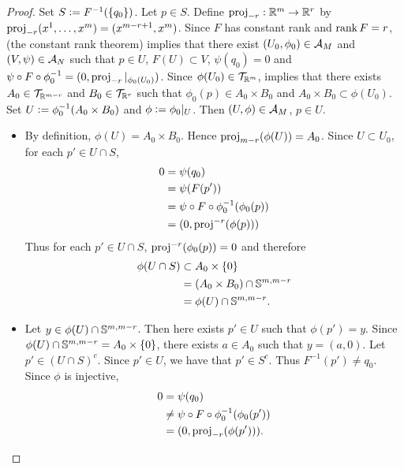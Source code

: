 \documentclass{book}
\begin{document}
	\begin{proof}
		Set $S \defeq F^{-1}(\{q_0\})$. Let $p \in S$. Define $\prj_{-r}: \R^m \rightarrow \R^{r}$ by $\prj_{-r}(x^1, \ldots, x^m) = (x^{m-r+1}, x^{m})$. Since $F$ has constant rank and $\rnk F = r$,  (the constant rank theorem)  implies that there exist $(U_0, \phi_0) \in \MA_M$ and $(V, \psi) \in \MA_N$ such that $p \in U$, $F(U) \subset V$, $\psi(q_0) = 0$ and $\psi \circ F \circ \phi_0^{-1} = (0, \prj_{-r}|_{\phi_0(U_0)})$. Since $\phi(U_0) \in \MT_{\R^m}$,  implies that there exists $A_0 \in \MT_{\R^{m-r}}$ and $B_0 \in \MT_{\R^{r}}$ such that $\phi_0(p) \in A_0 \times B_0$ and $A_0 \times B_0 \subset \phi(U_0)$. Set $U \defeq \phi_0^{-1}(A_0 \times B_0)$ and $\phi \defeq \phi_0|_U$. Then $(U, \phi) \in \MA_M$, $p \in U$. 
		\begin{itemize}
			\item By definition, $\phi(U) = A_0 \times B_0$. Hence $\prj_{m-r}(\phi(U)) = A_0$. Since $U \subset U_0$, for each $p' \in U \cap S$, 
			\begin{align*}
				0
				& = \psi(q_0) \\
				& = \psi(F(p')) \\
				& = \psi \circ F \circ \phi_0^{-1}(\phi_0(p)) \\
				& = (0, \prj^{-r}(\phi(p)))
			\end{align*}
			Thus for each $p' \in U \cap S$, $\prj^{-r}(\phi_0(p)) = 0$ and therefore 
			\begin{align*}
				\phi(U \cap S) 
				& \subset A_0 \times \{0\} \\
				& = (A_0 \times B_0) \cap \S^{m, m-r} \\
				& = \phi(U) \cap \S^{m, m-r}.
			\end{align*}
			\item Let $y \in \phi(U) \cap \S^{m, m-r}$. Then here exists $p' \in U$ such that $\phi(p') = y$. Since  $\phi(U) \cap \S^{m, m-r} = A_0 \times \{0\}$, there exists $a \in A_0$ such that $y = (a, 0)$. Let $p' \in (U \cap S)^c$. Since $p' \in U$, we have that $p' \in S^c$. Thus $F^{-1}(p') \neq q_0$. Since $\phi$ is injective, 
			\begin{align*}
				0
				& = \psi(q_0) \\
				& \neq \psi \circ F \circ \phi_0^{-1}(\phi_0(p')) \\
				& = (0, \prj_{-r}(\phi(p'))).

\end{align*}
\end{itemize}
\end{proof}
\end{document}
